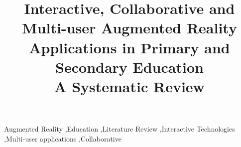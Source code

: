 \documentclass[review]{elsarticle}
\begin{document}
\begin{frontmatter}

\title{Interactive, Collaborative and Multi-user Augmented Reality Applications in Primary and Secondary Education\\A Systematic Review}

    
  	



\begin{keyword}
Augmented Reality \sep Education \sep Literature Review \sep Interactive Technologies \sep Multi-user applications \sep Collaborative
\end{keyword}

\end{frontmatter}

\linenumbers









\clearpage
\newpage
{}





\theendnotes
\end{document}
